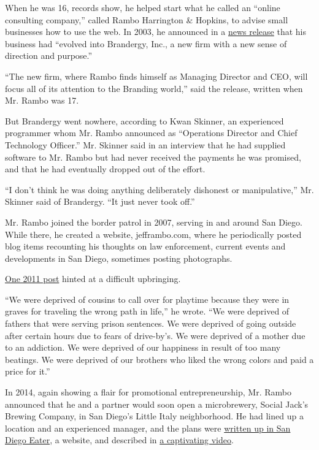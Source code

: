 When he was 16, records show, he helped start what he called an ``online
consulting company,'' called Rambo Harrington \& Hopkins, to advise
small businesses how to use the web. In 2003, he announced in a
\href{http://web.archive.org/web/20030209075010/http://www.brandergy.com/}{news
release} that his business had ``evolved into Brandergy, Inc., a new
firm with a new sense of direction and purpose.''

``The new firm, where Rambo finds himself as Managing Director and CEO,
will focus all of its attention to the Branding world,'' said the
release, written when Mr. Rambo was 17.

But Brandergy went nowhere, according to Kwan Skinner, an experienced
programmer whom Mr. Rambo announced as ``Operations Director and Chief
Technology Officer.'' Mr. Skinner said in an interview that he had
supplied software to Mr. Rambo but had never received the payments he
was promised, and that he had eventually dropped out of the effort.

``I don't think he was doing anything deliberately dishonest or
manipulative,'' Mr. Skinner said of Brandergy. ``It just never took
off.''

Mr. Rambo joined the border patrol in 2007, serving in and around San
Diego. While there, he created a website, jefframbo.com, where he
periodically posted blog items recounting his thoughts on law
enforcement, current events and developments in San Diego, sometimes
posting photographs.

\href{http://web.archive.org/web/20131005004011/http://jefframbo.com/2011/07/01/justice-anyone/}{One
2011 post} hinted at a difficult upbringing.

``We were deprived of cousins to call over for playtime because they
were in graves for traveling the wrong path in life,'' he wrote. ``We
were deprived of fathers that were serving prison sentences. We were
deprived of going outside after certain hours due to fears of
drive-by's. We were deprived of a mother due to an addiction. We were
deprived of our happiness in result of too many beatings. We were
deprived of our brothers who liked the wrong colors and paid a price for
it.''

In 2014, again showing a flair for promotional entrepreneurship, Mr.
Rambo announced that he and a partner would soon open a microbrewery,
Social Jack's Brewing Company, in San Diego's Little Italy neighborhood.
He had lined up a location and an experienced manager, and the plans
were
\href{https://sandiego.eater.com/2014/2/19/6276997/new-little-italy-brewery-wants-to-get-social-with-you}{written
up in San Diego Eater}, a website, and described in
\href{https://ksr-video.imgix.net/projects/889648/video-351836-h264_high.mp4}{a
captivating video}.

